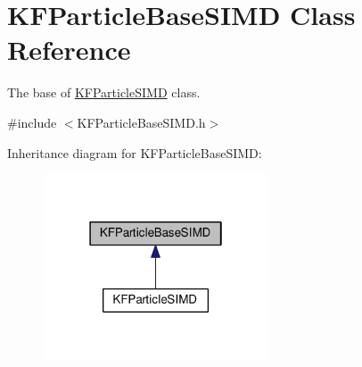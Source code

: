 \hypertarget{classKFParticleBaseSIMD}{}\section{K\+F\+Particle\+Base\+S\+I\+MD Class Reference}
\label{classKFParticleBaseSIMD}


The base of \hyperlink{classKFParticleSIMD}{K\+F\+Particle\+S\+I\+MD} class.  




{\ttfamily \#include $<$K\+F\+Particle\+Base\+S\+I\+M\+D.\+h$>$}



Inheritance diagram for K\+F\+Particle\+Base\+S\+I\+MD\+:\nopagebreak
\begin{figure}[H]
\begin{center}
\leavevmode
\includegraphics[width=190pt]{classKFParticleBaseSIMD__inherit__graph}
\end{center}
\end{figure}
